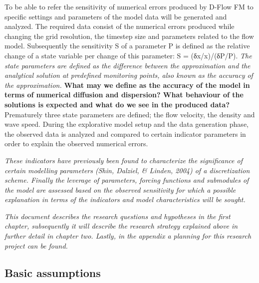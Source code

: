 To be able to refer the sensitivity of numerical errors produced by
D-Flow FM to specific settings and parameters of the model data will be
generated and analyzed. The required data consist of the numerical
errors produced while changing the grid resolution, the timestep size
and parameters related to the flow model. Subsequently the sensitivity S
of a parameter P is defined as the relative change of a state variable
per change of this parameter: S = (δx/x)/(δP/P). \emph{The state
parameters are defined as the difference between the approximation and
the analytical solution at predefined monitoring points, also known as
the accuracy of the approximation.} \textbf{What may we define as the
accuracy of the model in terms of numerical diffusion and dispersion?
What behaviour of the solutions is expected and what do we see in the
produced data?} Prematurely three state parameters are defined; the flow
velocity, the density and wave speed. During the explorative model setup
and the data generation phase, the observed data is analyzed and
compared to certain indicator parameters in order to explain the
observed numerical errors.

\emph{These indicators have previously been found to characterize the
significance of certain modelling parameters (Shin, Dalziel, \& Linden,
2004) of a discretization scheme. Finally the leverage of parameters,
forcing functions and submodules of the model are assessed based on the
observed sensitivity for which a possible explanation in terms of the
indicators and model characteristics will be sought.}

\emph{This document describes the research questions and hypotheses in
the first chapter, subsequently it will describe the research strategy
explained above in further detail in chapter two. Lastly, in the
appendix a planning for this research project can be found.}

\subsection{Basic assumptions}\label{basic-assumptions}

